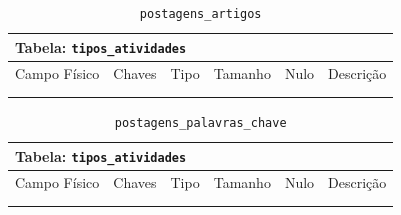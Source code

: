 \documentclass[12pt,a4paper]{article}
\begin{document}
\begin{center}
\begin{table}[h!]
	\caption{\texttt{postagens\_artigos}}
	\label{tabela:postagensArtigos}
	\begin{tabular}{|p{2.5cm}|p{1cm}|p{1.25cm}|p{1.75cm}|p{1.25cm}|p{5cm}|}\hline	
		\multicolumn{6}{|p{16cm}|}{\cellcolor{cinzaClaro}  \centering Tabela: \texttt{tipos\_atividades}} \\ \hline %
		{\small Campo Físico}   & {\small Chaves} & {\small Tipo} & {\small Tamanho} & {\small Nulo} & {\small Descrição}\\\hline %
		
		{\tiny } & {\tiny } & {\tiny } & {\tiny } & {\tiny } &{\tiny }\\\hline
		{\tiny } & {\tiny } & {\tiny } & {\tiny } & {\tiny } &{\tiny }\\\hline
		
			
	\end{tabular}
\end{table}	
\end{center}


\begin{center}
\begin{table}[h!]
	\caption{\texttt{postagens\_palavras\_chave}}
	\label{tabela:postagensPalavrasChave}
	\begin{tabular}{|p{2.5cm}|p{1cm}|p{1.25cm}|p{1.75cm}|p{1.25cm}|p{5cm}|}\hline	
		\multicolumn{6}{|p{16cm}|}{\cellcolor{cinzaClaro}  \centering Tabela: \texttt{tipos\_atividades}} \\ \hline %
		{\small Campo Físico}   & {\small Chaves} & {\small Tipo} & {\small Tamanho} & {\small Nulo} & {\small Descrição}\\\hline %
		
		{\tiny } & {\tiny } & {\tiny } & {\tiny } & {\tiny } &{\tiny }\\\hline
		{\tiny } & {\tiny } & {\tiny } & {\tiny } & {\tiny } &{\tiny }\\\hline
			
	\end{tabular}
\end{table}	
\end{center}
\end{document}
